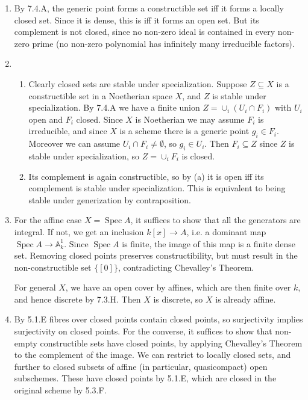 \documentclass{report}
\newcommand{\A}{\mathbb{A}}
\DeclareMathOperator{\Spec}{Spec}
\begin{document}
\begin{enumerate}[label=\textbf{7.4.\Alph*.}]
	\item By 7.4.A, the generic point forms a constructible set iff it forms a
	      locally closed set. Since it is dense, this is iff it forms an open set.
	      But its complement is not closed, since no non-zero ideal is contained
	      in every non-zero prime (no non-zero polynomial has infinitely many
	      irreducible factors).

	\item
	      \begin{enumerate}[label=(\alph*)]
		      \item Clearly closed sets are stable under specialization. Suppose
		            $Z\subseteq X$ is a constructible set in a Noetherian space $X$,
		            and $Z$ is stable under specialization. By 7.4.A we have a
		            finite union $Z=\cup_i(U_i\cap F_i)$ with $U_i$ open and $F_i$
		            closed. Since $X$ is Noetherian we may assume $F_i$ is
		            irreducible, and since $X$ is a scheme there is a generic point
		            $g_i\in F_i$. Moreover we can assume $U_i\cap F_i\ne\emptyset$,
		            so $g_i\in U_i$. Then $F_i\subseteq Z$ since $Z$ is stable under
		            specialization, so $Z=\cup_iF_i$ is closed.

		      \item Its complement is again constructible, so by (a) it is open
		            iff its complement is stable under specialization. This is
		            equivalent to being stable under generization by contraposition.
	      \end{enumerate}

	\item For the affine case $X=\Spec A$, it suffices to show that all the
	      generators are integral. If not, we get an inclusion $k[x]\to A$, i.e. a
	      dominant map $\Spec A\to\A^1_k$. Since $\Spec A$ is finite, the image of
	      this map is a finite dense set. Removing closed points preserves
	      constructibility, but must result in the non-constructible set $\{[0]\}$,
	      contradicting Chevalley's Theorem.

	      For general $X$, we have an open cover by affines, which are then finite
	      over $k$, and hence discrete by 7.3.H. Then $X$ is discrete, so $X$ is
	      already affine.

	\item By 5.1.E fibres over closed points contain closed points, so
	      surjectivity implies surjectivity on closed points. For the converse, it
	      suffices to show that non-empty constructible sets have closed points,
	      by applying Chevalley's Theorem to the complement of the image. We can
	      restrict to locally closed sets, and further to closed subsets of affine
	      (in particular, quasicompact) open subschemes. These have closed points
	      by 5.1.E, which are closed in the original scheme by 5.3.F.


\end{enumerate}
\end{document}
